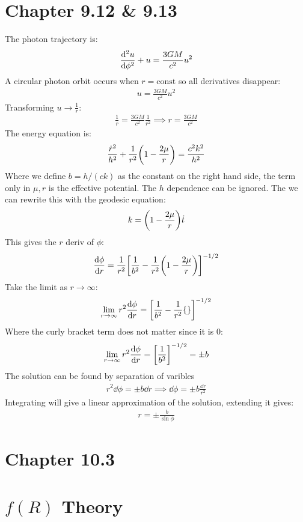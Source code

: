 \documentclass[12pt]{article}
\begin{document}
\section{Chapter 9.12 \& 9.13}
The photon trajectory is:
\begin{align*}
  \dv[2]{u}{\phi}+u=\frac{3GM}{c^2}u^2
\end{align*}
A circular photon orbit occurs when $r=\text{const}$ so all derivatives disappear:
\begin{align*}
  u=\frac{3GM}{c^2}u^2
\end{align*}
Transforming $u\to\frac{1}{r}$:
\begin{align*}
  \frac{1}{r}=\frac{3GM}{c^2}\frac{1}{r^2}\implies r=\frac{3GM}{c^2}
\end{align*}
The energy equation is:
\begin{align*}
  \frac{\dot{r}^2}{h^2}+\frac{1}{r^2}\qty(1-\frac{2\mu}{r})=\frac{c^2k^2}{h^2}
\end{align*}
Where we define $b=h/(ck)$ as the constant on the right hand side, the term only in $\mu,r$ is the effective potential. The $h$ dependence can be ignored. The we can rewrite this with the geodesic equation:
\begin{align*}
  k=\qty(1-\frac{2\mu}{r})\dot{t}
\end{align*}
This gives the $r$ deriv of $\phi$:
\begin{align*}
  \dv{\phi}{r}=\frac{1}{r^2}
  \qty[\frac{1}{b^2}-\frac{1}{r^2}\qty(1-\frac{2\mu}{r})]^{-1/2}
\end{align*}
Take the limit as $r\to\infty:$
\begin{align*}
  \lim_{r\to\infty}r^2\dv{\phi}{r}=\qty[\frac{1}{b^2}-\frac{1}{r^2}\{\}]^{-1/2}
\end{align*}
Where the curly bracket term does not matter since it is $0$:
\begin{align*}
  \lim_{r\to\infty}r^2\dv{\phi}{r}=\qty[\frac{1}{b^2}]^{-1/2}=\pm b
\end{align*}
The solution can be found by separation of varibles
\begin{align*}
  r^2\dd{\phi}=\pm b\dd{r}\implies\dd{\phi}=\pm b\frac{\dd{r}}{r^2}
\end{align*}
Integrating will give a linear approximation of the solution, extending it gives:
\begin{align*}
  r=\pm\frac{b}{\sin\phi}
\end{align*}
\section{Chapter 10.3}

\section{$f(R)$ Theory}
\end{document}
